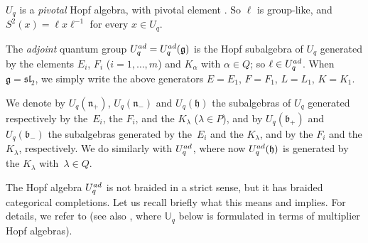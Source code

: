 \documentclass[11pt]{article}
\numberwithin{equation}{section}
\numberwithin{equation}{section}
\theoremstyle{definition}
\newcommand{\mUq}{\mathbb{U}_q}
\begin{document}
$U_q$ is a {\it pivotal} Hopf algebra, with pivotal element .
So $\ell$ is group-like, and $S^2(x) = \ell x\ell^{-1}$ for every $x\in U_q$.

The {\it adjoint} quantum group $U_q^{\rm ad} = U_q^{\rm ad}(\mathfrak{g})$ is the Hopf subalgebra of $U_q$ generated by the elements $E_i$, $F_i$ ($i=1,\dots,m$) and $K_\alpha$ with $\alpha\in Q$; so $\ell\in U_q^{\rm ad}$. When $\mathfrak{g}={\mathfrak{sl}_2}$, we simply write the above generators $E=E_1$, $F=F_1$, $L=L_1$, $K=K_1$.

We denote by $U_q(\mathfrak{n}_+)$, $U_q(\mathfrak{n}_-)$ and $U_q(\mathfrak{h})$ the subalgebras of $U_q$ generated respectively by the~$E_i$, the $F_i$, and the $K_\lambda$ ($\lambda\in P$), and by $U_q(\mathfrak{b}_+)$ and $U_q(\mathfrak{b}_-)$ the subalgebras generated by the~$E_i$ and the $K_\lambda$, and by the $F_i$ and the $K_\lambda$, respectively. We do similarly with $U_q^{\rm ad}$, where now $U_q^{\rm ad}(\mathfrak{h})$ is generated by the $K_\lambda$ with~$\lambda\in Q$.

The Hopf algebra $U_q^{\rm ad}$ is not braided in a strict sense, but it has braided categorical completions. Let us recall briefly what this means and implies. For details, we refer to \cite[Sections~2 and~3]{BR} (see also \cite[Section~3.10]{VY}, where $\mUq$ below is formulated in terms of multiplier Hopf algebras).
\end{document}
